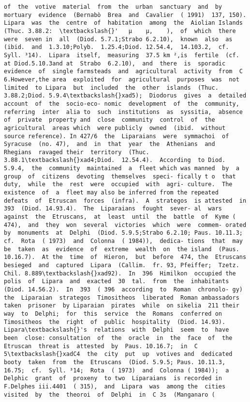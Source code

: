 \documentclass[11pt]{article}
\begin{document}
\begin{Verbatim}[commandchars=\\\{\}]
of  the  votive  material  from  the  urban  sanctuary  and  by mortuary  evidence  (Bernabò  Brea  and  Cavalier  ( 1991)  137, 150). Lipara  was  the  centre  of  habitation  among  the  Aiolian Islands  (Thuc. 3.88.2:  \textbackslash{}'   µ    µ,    ),  of  which  there  were  seven in  all  (Diod. 5.7.1;Strabo 6.2.10),  known  also  as      (ibid.  and  1.3.10;Polyb.  1.25.4;Diod. 12.54.4,  14.103.2,  cf.  Syll. ³14).  Lipara  itself,  measuring  37.5 km ²,is  fertile  (cf. at Diod.5.10.3and at  Strabo  6.2.10),  and  there  is  sporadic  evidence  of  single farmsteads  and  agricultural  activity  from  C 6.However,the area  exploited  for  agricultural  purposes  was  not  limited  to Lipara  but  included  the  other  islands  (Thuc. 3.88.2;Diod. 5.9.4\textbackslash{}xad5);  Diodorus  gives  a  detailed  account  of  the  socio-eco- nomic  development  of  the  community,  referring  inter  alia to  such  institutions  as  syssitia,  absence  of  private  property and  close  community  control  of  the  agricultural  areas which  were publicly  owned  (ibid.  without  source reference). In 427/6  the  Liparaians  were  symmachoi  of  Syracuse  (no. 47),  and  in  that  year  the  Athenians  and  Rhegians  ravaged their  territory  (Thuc. 3.88.1\textbackslash{}xad4;Diod.  12.54.4).  According  to Diod. 5.9.4,  the  community  maintained  a  fleet which was manned  by  a  group  of  citizens  devoting  themselves  speci- fically t o  that  duty,  while  the  rest  were  occupied  with  agri- culture.  The  existence  of  a  fleet may also be inferred from the repeated  defeats  of  Etruscan  forces  (infra).  A  strategos  is attested  in  393  (Diod. 14.93.4).  The  Liparaians  fought  sever- al  wars  against  the  Etruscans,  at  least  until  the  battle  of  Kyme ( 474),  and  they  won  several  victories  which  were  commem- orated  by  monuments  at  Delphi  (Diod. 5.9.5;Strabo 6.2.10; Paus. 10.11.3;  cf.  Rota  ( 1973)  and  Colonna  ( 1984)),  dedica- tions  that  may  be  taken  as  evidence  of  extreme  wealth  on  the island  (Paus. 10.16.7).  At the  time  of  Hieron,  but  before  474, the  Etruscans  besieged  and  captured  Lipara  (Callim.  fr. 93, Pfeiffer;  Tzetz.  Chil. 8.889\textbackslash{}xad92).  In  396  Himilkon  occupied the  polis  of  Lipara  and  exacted  30  tal.  from  the  inhabitants (Diod. 14.56.2).  In  393  ( 396  according  to  Roman  chronolo- gy)  the  Liparaian  strategos  Timositheos  liberated  Roman ambassadors  taken  prisoner  by Liparaian  pirates  while  on sikelia  211 their  way  to  Delphi;  for  this  service  the  Romans  conferred on  Timositheos  the  right  of  public  hospitality  (Diod. 14.93). Lipara\textbackslash{}'s  relations  with  Delphi  seem  to  have  been  close: consultation  of  the  oracle  in  the  face  of  the  Etruscan  threat is  attested  by  Paus. 10.16.7;  in  C 5\textbackslash{}xadC4  the  city  put  up  votives and  dedicated  booty  taken  from  the  Etruscans  (Diod. 5.9.5; Paus. 10.11.3,  16.75;  cf.  Syll. ³14;  Rota  ( 1973)  and  Colonna ( 1984));  a  Delphic  grant  of  proxeny  to two  Liparaians  is recorded in F.Delphes iii.4401  ( 315),  and  Lipara  was  among the  cities  visited  by  the  theoroi  of  Delphi  in  C 3s  (Manganaro ( 
\end{Verbatim}
\end{document}
